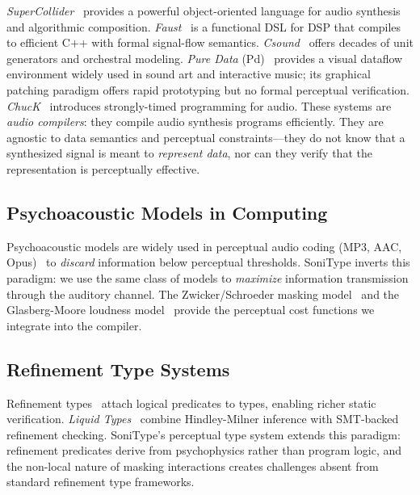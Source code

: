 \documentclass[sigchi, nonacm]{acmart}
\begin{document}
\emph{SuperCollider}~\cite{mccartney2002rethinking} provides a powerful object-oriented language for audio synthesis and algorithmic composition. \emph{Faust}~\cite{orlarey2009faust} is a functional DSL for DSP that compiles to efficient C++ with formal signal-flow semantics. \emph{Csound}~\cite{boulanger2000csound} offers decades of unit generators and orchestral modeling. \emph{Pure Data} (Pd)~\cite{puckette1996pure} provides a visual dataflow environment widely used in sound art and interactive music; its graphical patching paradigm offers rapid prototyping but no formal perceptual verification. \emph{ChucK}~\cite{wang2003chuck} introduces strongly-timed programming for audio. These systems are \emph{audio compilers}: they compile audio synthesis programs efficiently. They are agnostic to data semantics and perceptual constraints---they do not know that a synthesized signal is meant to \emph{represent data}, nor can they verify that the representation is perceptually effective.

\subsection{Psychoacoustic Models in Computing}

Psychoacoustic models are widely used in perceptual audio coding (MP3, AAC, Opus)~\cite{painter2000perceptual, bosi2002introduction} to \emph{discard} information below perceptual thresholds. SoniType inverts this paradigm: we use the same class of models to \emph{maximize} information transmission through the auditory channel. The Zwicker/Schroeder masking model~\cite{zwicker2013psychoacoustics, schroeder1979optimum} and the Glasberg-Moore loudness model~\cite{glasberg2002model} provide the perceptual cost functions we integrate into the compiler.

\subsection{Refinement Type Systems}

Refinement types~\cite{freeman1991refinement, rondon2008liquid} attach logical predicates to types, enabling richer static verification. \emph{Liquid Types}~\cite{rondon2008liquid} combine Hindley-Milner inference with SMT-backed refinement checking. SoniType's perceptual type system extends this paradigm: refinement predicates derive from psychophysics rather than program logic, and the non-local nature of masking interactions creates challenges absent from standard refinement type frameworks.
\end{document}
